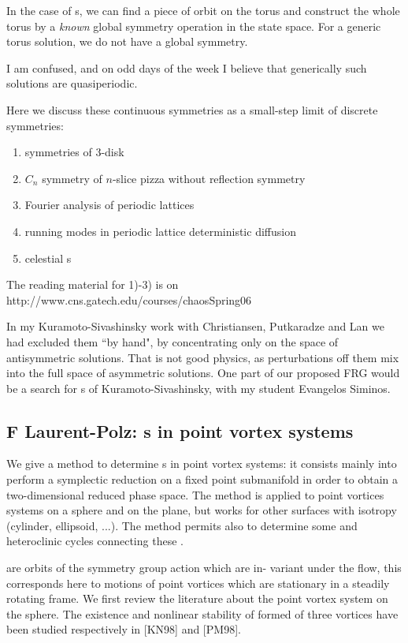       In the case of {\rpo s}, we can find a piece of orbit on
the torus and construct the whole torus by a {\em known}
global symmetry operation in the
state space. For a generic torus solution, we do not have 
a global symmetry. 

        I am confused, and on odd days of the week I
 believe that generically such solutions are quasiperiodic.

        Here we discuss these continuous symmetries as
a small-step limit of discrete symmetries:

\begin{enumerate}
\item
        symmetries of 3-disk
\item
        $C_n$ symmetry of $n$-slice pizza without reflection symmetry
\item
        Fourier analysis of periodic lattices
\item
        running modes in periodic lattice deterministic
           diffusion
\item
	celestial {\rpo s}
\end{enumerate}

The reading material for 1)-3) is on
http://www.cns.gatech.edu/courses/chaosSpring06

In my Kuramoto-Sivashinsky work with Christiansen, Putkaradze and Lan we
had excluded them ``by hand", by concentrating only on the space of
antisymmetric solutions. That is not good physics, as perturbations off
them mix into the full space of asymmetric solutions. One part of our
proposed FRG would be a search for {\rpo s} of
Kuramoto-Sivashinsky, with my student Evangelos Siminos.

\subsection{F Laurent-Polz: {\Rpo s} in point vortex systems}

We give a method to determine {\rpo s} in point vortex systems: it consists mainly into perform a symplectic reduction on a fixed point submanifold in order to obtain a two-dimensional reduced phase space. The method is applied to point vortices systems on a sphere and on the plane, but works for other surfaces with isotropy (cylinder, ellipsoid, ...). The method permits also to determine some 
{\reqva} and heteroclinic cycles connecting these {\reqva}.

    {\Reqva} are orbits of the symmetry group action which are in-
variant under the flow, this corresponds here to motions of point vortices which
are stationary in a steadily rotating frame. We first review the literature about
the point vortex system on the sphere. The existence and nonlinear stability
of {\reqva} formed of three vortices have been studied respectively in
[KN98] and [PM98]. 

